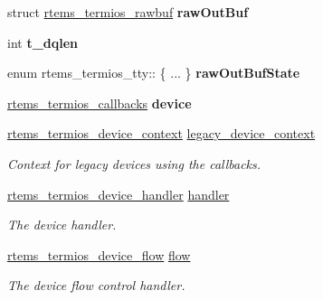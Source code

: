 \begin{DoxyCompactItemize}
struct \mbox{\hyperlink{structrtems__termios__rawbuf}{rtems\+\_\+termios\+\_\+rawbuf}} {\bfseries raw\+Out\+Buf}
\item 
\mbox{\label{structrtems__termios__tty_aff3916353a4bcf99dd62ea4363790d3d}} 
int {\bfseries t\+\_\+dqlen}
\item 
\mbox{\label{structrtems__termios__tty_ab834376c5fe03c26d1c3f047220db77e}} 
enum rtems\+\_\+termios\+\_\+tty\+:: \{ ... \}  {\bfseries raw\+Out\+Buf\+State}
\item 
\mbox{\label{structrtems__termios__tty_ae5fefef31757d79c01d5b11be7ac122d}} 
\mbox{\hyperlink{structrtems__termios__callbacks}{rtems\+\_\+termios\+\_\+callbacks}} {\bfseries device}
\item 
\mbox{\label{structrtems__termios__tty_ac168aef7e881f07a7719d529c39ce102}} 
\mbox{\hyperlink{structrtems__termios__device__context}{rtems\+\_\+termios\+\_\+device\+\_\+context}} \mbox{\hyperlink{structrtems__termios__tty_ac168aef7e881f07a7719d529c39ce102}{legacy\+\_\+device\+\_\+context}}
\begin{DoxyCompactList}\small\item\em Context for legacy devices using the callbacks. \end{DoxyCompactList}\item 
\mbox{\label{structrtems__termios__tty_a0771708a89fd0eee92a398dfc5d6268d}} 
\mbox{\hyperlink{structrtems__termios__device__handler}{rtems\+\_\+termios\+\_\+device\+\_\+handler}} \mbox{\hyperlink{structrtems__termios__tty_a0771708a89fd0eee92a398dfc5d6268d}{handler}}
\begin{DoxyCompactList}\small\item\em The device handler. \end{DoxyCompactList}\item 
\mbox{\label{structrtems__termios__tty_afff47620e0924cd2781ad5efc1bb8759}} 
\mbox{\hyperlink{structrtems__termios__device__flow}{rtems\+\_\+termios\+\_\+device\+\_\+flow}} \mbox{\hyperlink{structrtems__termios__tty_afff47620e0924cd2781ad5efc1bb8759}{flow}}
\begin{DoxyCompactList}\small\item\em The device flow control handler. \end{DoxyCompactList}\item 

\end{DoxyCompactItemize}
